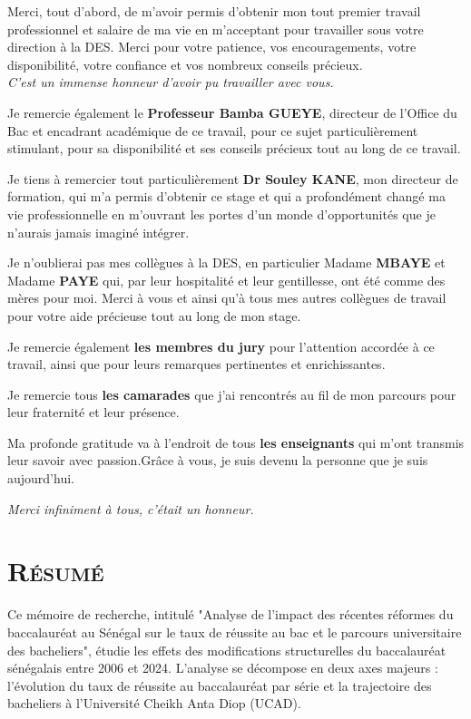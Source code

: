 \documentclass[a4paper,12pt]{report}                %
\begin{document}
    Merci, tout d’abord, de m’avoir permis d’obtenir mon tout premier travail professionnel et salaire de ma vie en m’acceptant pour travailler sous votre direction à la DES. Merci pour votre patience, vos encouragements, 
    votre disponibilité, votre confiance et vos nombreux conseils précieux.\\
    \textit{ C’est un immense honneur d’avoir pu travailler avec vous.}

    Je remercie également le \textbf{Professeur Bamba GUEYE}, directeur de l’Office du Bac et encadrant académique de ce travail, pour ce sujet particulièrement stimulant, pour sa disponibilité et ses conseils précieux tout au long de ce travail.

    Je tiens à remercier tout particulièrement \textbf{Dr Souley KANE}, mon directeur de formation, qui m’a permis d’obtenir ce stage et qui a profondément changé ma vie professionnelle en m’ouvrant les portes d’un monde d’opportunités que je n’aurais jamais imaginé intégrer.

    Je n’oublierai pas mes collègues à la DES, en particulier Madame \textbf{MBAYE} et Madame \textbf{PAYE} qui, par leur hospitalité et leur gentillesse, ont été comme des mères pour moi.
    Merci à vous et ainsi qu’à tous mes autres collègues de travail pour votre aide précieuse tout au long de mon stage.

    Je remercie également \textbf{les membres du jury} pour l’attention accordée à ce travail, ainsi que pour leurs remarques pertinentes et enrichissantes.

    Je remercie tous \textbf{les camarades} que j’ai rencontrés au fil de mon parcours pour leur fraternité et leur présence.

    Ma profonde gratitude va à l’endroit de tous \textbf{les enseignants} qui m’ont transmis leur savoir avec passion.Grâce à vous, je suis devenu la personne que je suis aujourd’hui.

    \vspace{0.5cm}
    \hfill \textit{Merci infiniment à tous, c'était un honneur.}

    \newpage
    \section*{\textsc{Résumé}}

    Ce mémoire de recherche, intitulé "Analyse de l'impact des récentes réformes du baccalauréat au Sénégal sur le taux de réussite au bac et le parcours universitaire des bacheliers", étudie les effets des modifications structurelles du baccalauréat sénégalais entre 2006 et 2024. 
    L'analyse se décompose en deux axes majeurs : l'évolution du taux de réussite au baccalauréat par série et la trajectoire des bacheliers à l'Université Cheikh Anta Diop (UCAD).
\end{document}
